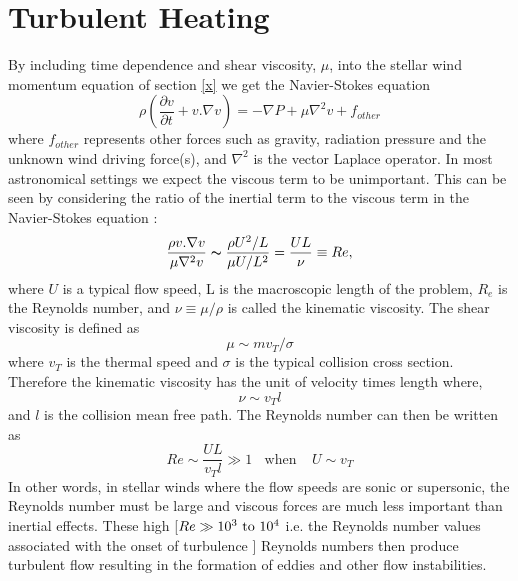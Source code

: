 \chapter{Turbulent Heating}\label{app:4}


By including time dependence and shear viscosity, $\mu$, into the stellar wind momentum equation of section \ref{x} we get the Navier-Stokes equation
\begin{equation}
\rho \left(\frac{\partial v}{\partial t}+v. \nabla v\right)=-\nabla P + \mu \nabla ^2{v} + f_{other}
\end{equation} 
where $f_{other}$ represents other forces such as gravity, radiation pressure and the unknown wind driving force(s), and $\nabla ^2$ is the vector Laplace operator. In most astronomical settings we expect the viscous term to be unimportant. This can be seen by considering the ratio of the inertial term to the viscous term in the Navier-Stokes equation \cite{shu_1992}:
\begin{equation}
\frac{\rho v.\nabla v}{\mu \nabla ^2 v} \thicksim \frac{\rho U^2 /L}{\mu U / L^2}=\frac{UL}{\nu} \equiv Re,
\end{equation} 
where $U$ is a typical flow speed, L is the macroscopic length of the problem, $R_{e}$ is the Reynolds number, and $\nu \equiv \mu /\rho$ is called the kinematic viscosity. The shear viscosity is defined as
\begin{equation}
\mu \sim mv_{T}/\sigma
\end{equation} 
where $v_{T}$ is the thermal speed and $\sigma$ is the typical collision cross section. Therefore the kinematic viscosity has the unit of velocity times length where,
\begin{equation}
\nu \sim v_{T}l
\end{equation} 
and $l$ is the collision mean free path. The Reynolds number can then be written as \cite{1992pavi.book.....S}
\begin{equation}
Re \sim \frac{UL}{v_{T}l} \gg 1 \ \ \ \ \mathrm{when} \ \ \ \ \ U \sim v_{T}
\end{equation} 
In other words, in stellar winds where the flow speeds are sonic or supersonic, the Reynolds number must be large and viscous forces are much less important than inertial effects. These high [$Re \gg 10^3 \ \rm{to} \ 10^4$ i.e. the Reynolds number values associated with the onset of turbulence \cite{1998ISAA....4.....H}] Reynolds numbers then produce turbulent flow resulting in the formation of eddies and other flow instabilities.\\
